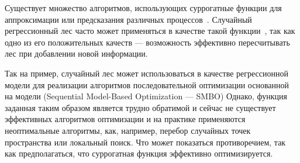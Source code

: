 \documentclass[pscyr,specification,annotation]{itmo-student-thesis}
\begin{document}





\tableofcontents

\startprefacepage

Существует множество алгоритмов, использующих суррогатные функции для
аппроксимации или предсказания различных процессов~\cite{surrogate}. Случайный
регрессионный лес часто может применяться в качестве такой
функции~\cite{randomsurr}, так как одно из его положительных качеств ---
возможность эффективно пересчитывать лес при добавлении новой информации.

Так на пример, случайный лес может использоваться в качестве регрессионной
модели для реализации алгоритмов последовательной оптимизации основанной на
модели (Sequential Model-Based Optimization --- SMBO\cite{smac}) Однако, функция
заданная таким образом является трудно обратимой и сейчас не существует
эффективных алгоритмов оптимизации и на практике применяются неоптимальные
алгоритмы, как, например, перебор случайных точек пространства или локальный
поиск. Что может показаться противоречием, так как предполагаться, что
суррогатная функция эффективно оптимизируется.
\end{document}
